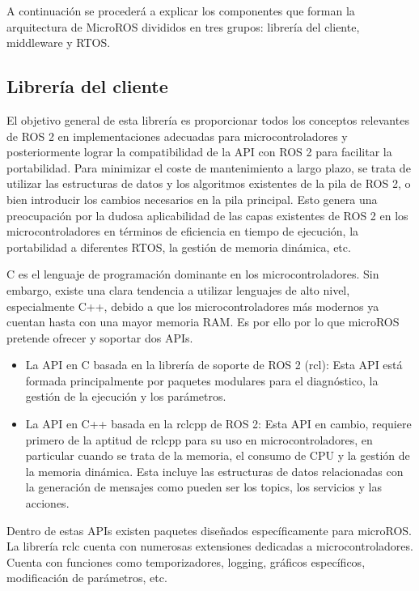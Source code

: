 \documentclass[a4paper,11pt,spanish]{sphinxmanual}
\begin{document}
\sphinxAtStartPar
A continuación se procederá a explicar los componentes que forman la
arquitectura de Micro\sphinxhyphen{}ROS divididos en tres grupos: librería del
cliente, middleware y RTOS.


\subsection{Librería del cliente}
\label{\detokenize{software:libreria-del-cliente}}
\sphinxAtStartPar
El objetivo general de esta librería es proporcionar todos los conceptos
relevantes de ROS 2 en implementaciones adecuadas para
microcontroladores y posteriormente lograr la compatibilidad de la API
con ROS 2 para facilitar la portabilidad. Para minimizar el coste de
mantenimiento a largo plazo, se trata de utilizar las estructuras de
datos y los algoritmos existentes de la pila de ROS 2, o bien introducir
los cambios necesarios en la pila principal. Esto genera una
preocupación por la dudosa aplicabilidad de las capas existentes de ROS
2 en los microcontroladores en términos de eficiencia en tiempo de
ejecución, la portabilidad a diferentes RTOS, la gestión de memoria
dinámica, etc.

\sphinxAtStartPar
C es el lenguaje de programación dominante en los microcontroladores.
Sin embargo, existe una clara tendencia a utilizar lenguajes de alto
nivel, especialmente C++, debido a que los microcontroladores más
modernos ya cuentan hasta con una mayor memoria RAM. Es por ello por
lo que micro\sphinxhyphen{}ROS pretende ofrecer y soportar dos APIs.
\begin{itemize}
\item {} 
\sphinxAtStartPar
La API en C basada en la librería de soporte de ROS 2 (rcl): Esta API
está formada principalmente por paquetes modulares para el
diagnóstico, la gestión de la ejecución y los parámetros.

\item {} 
\sphinxAtStartPar
La API en C++ basada en la rclcpp de ROS 2: Esta API en cambio,
requiere primero de la aptitud de rclcpp para su uso en
microcontroladores, en particular cuando se trata de la memoria, el
consumo de CPU y la gestión de la memoria dinámica. Esta incluye las
estructuras de datos relacionadas con la generación de mensajes como
pueden ser los topics, los servicios y las acciones.

\end{itemize}

\sphinxAtStartPar
Dentro de estas APIs existen paquetes diseñados específicamente para
micro\sphinxhyphen{}ROS. La librería rclc cuenta con numerosas extensiones dedicadas a
microcontroladores. Cuenta con funciones como temporizadores, logging,
gráficos específicos, modificación de parámetros, etc.
\end{document}
